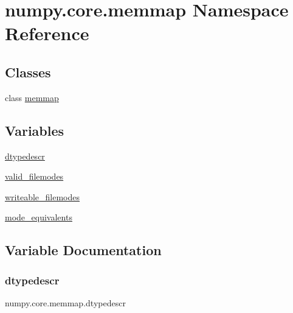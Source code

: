 \hypertarget{namespacenumpy_1_1core_1_1memmap}{}\section{numpy.\+core.\+memmap Namespace Reference}
\label{namespacenumpy_1_1core_1_1memmap}
\subsection*{Classes}
\begin{DoxyCompactItemize}
\item 
class \hyperlink{classnumpy_1_1core_1_1memmap_1_1memmap}{memmap}
\end{DoxyCompactItemize}
\subsection*{Variables}
\begin{DoxyCompactItemize}
\item 
\hyperlink{namespacenumpy_1_1core_1_1memmap_aa9f781c3c6f1e90137ecd3c0bd07393d}{dtypedescr}
\item 
\hyperlink{namespacenumpy_1_1core_1_1memmap_afaec941929a387219bd98fe6bbecc7ab}{valid\+\_\+filemodes}
\item 
\hyperlink{namespacenumpy_1_1core_1_1memmap_a885c84cdbe5896c1653bdfb9c99db286}{writeable\+\_\+filemodes}
\item 
\hyperlink{namespacenumpy_1_1core_1_1memmap_a6f7750cf3167822963da63415324492f}{mode\+\_\+equivalents}
\end{DoxyCompactItemize}


\subsection{Variable Documentation}
\mbox{\label{namespacenumpy_1_1core_1_1memmap_aa9f781c3c6f1e90137ecd3c0bd07393d}} 
\subsubsection{\texorpdfstring{dtypedescr}{dtypedescr}}
{\footnotesize\ttfamily numpy.\+core.\+memmap.\+dtypedescr}

\mbox{\label{namespacenumpy_1_1core_1_1memmap_a6f7750cf3167822963da63415324492f}} 
